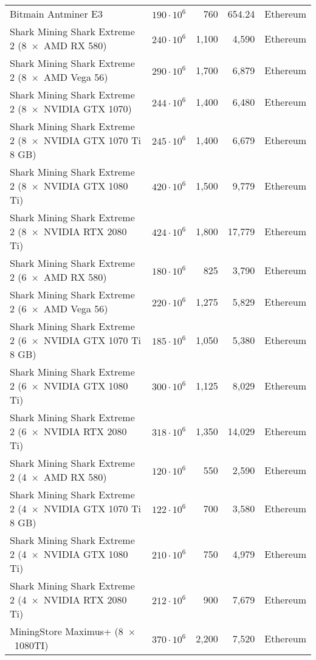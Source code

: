 \begin{longtable}{|p{}|r|r|r|p{}|}
  Bitmain Antminer E3                                                 & $190 \cdot 10^6$ & 760 & 654.24 & Ethereum \\
  Shark Mining Shark Extreme 2 (8~$\times$~AMD RX 580)                & $240 \cdot 10^6$ & 1,100 & 4,590 & Ethereum \\
  Shark Mining Shark Extreme 2 (8~$\times$~AMD Vega 56)               & $290 \cdot 10^6$ & 1,700 & 6,879 & Ethereum \\
  Shark Mining Shark Extreme 2 (8~$\times$~NVIDIA GTX 1070)           & $244 \cdot 10^6$ & 1,400 & 6,480 & Ethereum \\
  Shark Mining Shark Extreme 2 (8~$\times$~NVIDIA GTX 1070 Ti 8 GB)   & $245 \cdot 10^6$ & 1,400 & 6,679 & Ethereum \\
  Shark Mining Shark Extreme 2 (8~$\times$~NVIDIA GTX 1080 Ti)        & $420 \cdot 10^6$ & 1,500 & 9,779 & Ethereum \\
  Shark Mining Shark Extreme 2 (8~$\times$~NVIDIA RTX 2080 Ti)        & $424 \cdot 10^6$ & 1,800 & 17,779 & Ethereum \\
  Shark Mining Shark Extreme 2 (6~$\times$~AMD RX 580)                & $180 \cdot 10^6$ & 825 & 3,790 & Ethereum \\
  Shark Mining Shark Extreme 2 (6~$\times$~AMD Vega 56)               & $220 \cdot 10^6$ & 1,275 & 5,829 & Ethereum \\
  Shark Mining Shark Extreme 2 (6~$\times$~NVIDIA GTX 1070 Ti 8 GB)   & $185 \cdot 10^6$ & 1,050 & 5,380 & Ethereum \\
  Shark Mining Shark Extreme 2 (6~$\times$~NVIDIA GTX 1080 Ti)        & $300 \cdot 10^6$ & 1,125 & 8,029 & Ethereum \\
  Shark Mining Shark Extreme 2 (6~$\times$~NVIDIA RTX 2080 Ti)        & $318 \cdot 10^6$ & 1,350 & 14,029 & Ethereum \\
  Shark Mining Shark Extreme 2 (4~$\times$~AMD RX 580)                & $120 \cdot 10^6$ & 550 & 2,590 & Ethereum \\
  Shark Mining Shark Extreme 2 (4~$\times$~NVIDIA GTX 1070 Ti 8 GB)   & $122 \cdot 10^6$ & 700 & 3,580 & Ethereum \\
  Shark Mining Shark Extreme 2 (4~$\times$~NVIDIA GTX 1080 Ti)        & $210 \cdot 10^6$ & 750 & 4,979 & Ethereum \\
  Shark Mining Shark Extreme 2 (4~$\times$~NVIDIA RTX 2080 Ti)        & $212 \cdot 10^6$ & 900 & 7,679 & Ethereum \\
  MiningStore Maximus+ (8~$\times$~1080TI)                            & $370 \cdot 10^6$ & 2,200 & 7,520 & Ethereum \\

\end{longtable}
